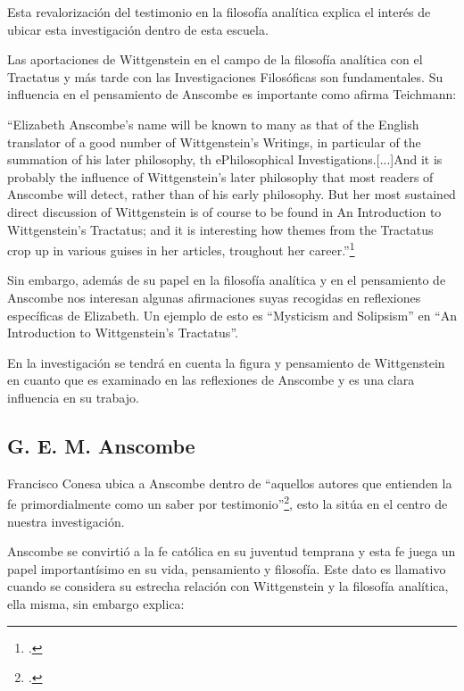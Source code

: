 \documentclass[12pt]{article}
\begin{document}
{Esta revalorización del testimonio en la filosofía analítica explica el interés de ubicar esta investigación dentro de esta escuela. 

Las aportaciones de Wittgenstein en el campo de la filosofía analítica con el Tractatus y más tarde con las Investigaciones Filosóficas son fundamentales. Su influencia en el pensamiento de Anscombe es importante como afirma Teichmann:

``Elizabeth Anscombe's name will be known to many as that of the English translator of a good number of Wittgenstein's Writings, in particular of the summation of his later philosophy, th ePhilosophical Investigations.[...]And it is probably the influence of Wittgenstein's later philosophy that most readers of Anscombe will detect, rather than of his early philosophy. But her most sustained direct discussion of Wittgenstein is of course to be found in An Introduction to Wittgenstein's Tractatus; and it is interesting how themes from the Tractatus crop up in various guises in her articles, troughout her career.''\footcite[191]{teichmann}

Sin embargo, además de su papel en la filosofía analítica y en el pensamiento de Anscombe nos interesan algunas afirmaciones suyas recogidas en reflexiones específicas de Elizabeth. Un ejemplo de esto es ``Mysticism and Solipsism'' en ``An Introduction to Wittgenstein's Tractatus''.

En la investigación se tendrá en cuenta la figura y pensamiento de Wittgenstein en cuanto que es examinado en las reflexiones de Anscombe y es una clara influencia en su trabajo.

\subsection{G. E. M. Anscombe}

Francisco Conesa ubica a Anscombe dentro de ``aquellos autores que entienden la fe primordialmente como un saber por testimonio''\footcite[84]{cyc}, esto la sitúa en el centro de nuestra investigación. 

Anscombe se convirtió a la fe católica en su juventud temprana y esta fe juega un papel importantísimo en su vida, pensamiento y filosofía. Este dato es llamativo cuando se considera su estrecha relación con Wittgenstein y la filosofía analítica, ella misma, sin embargo explica:

}
\end{document}

